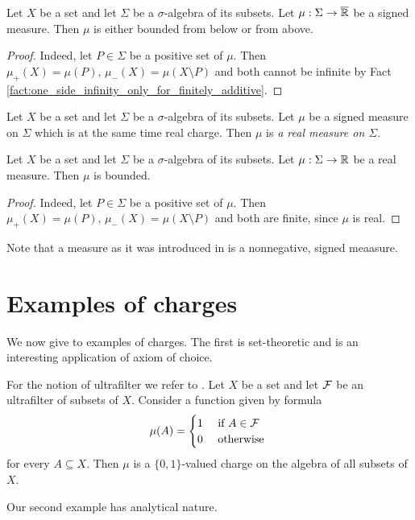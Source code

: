 \begin{corollary}\label{corollary:signed_measures_are_one_sided_bounded}
    Let $X$ be a set and let $\Sigma$ be a $\sigma$-algebra of its subsets. Let $\mu:\Sigma \rightarrow \overline{{\mathbb R}}$ be a signed measure. Then $\mu$ is either bounded from below or from above.
\end{corollary}
\begin{proof}
    Indeed, let $P \in \Sigma$ be a positive set of $\mu$. Then $\mu_+(X) = \mu(P),\,\mu_-(X) = \mu(X\setminus P)$ and both cannot be infinite by Fact \ref{fact:one_side_infinity_only_for_finitely_additive}.
\end{proof}

\begin{definition}
    Let $X$ be a set and let $\Sigma$ be a $\sigma$-algebra of its subsets. Let $\mu$ be a signed measure on $\Sigma$ which is at the same time real charge. Then $\mu$ is \textit{a real measure on $\Sigma$}.
\end{definition}

\begin{corollary}\label{corollary:real_measures_are_bounded}
    Let $X$ be a set and let $\Sigma$ be a $\sigma$-algebra of its subsets. Let $\mu:\Sigma \rightarrow {\mathbb R}$ be a real measure. Then $\mu$ is bounded.
\end{corollary}
\begin{proof}
    Indeed, let $P \in \Sigma$ be a positive set of $\mu$. Then $\mu_+(X) = \mu(P),\,\mu_-(X) = \mu(X\setminus P)$ and both are finite, since $\mu$ is real.
\end{proof}

\begin{remark}\label{remark:measure_is_nonnegative_signed_measure}
    Note that a measure as it was introduced in \cite{Integration} is a nonnegative, signed meaasure.
\end{remark}


\section{Examples of charges}
\noindent
We now give to examples of charges. The first is set-theoretic and is an interesting application of axiom of choice. 

\begin{example}\label{example:ultrafilter_charge}
    For the notion of ultrafilter we refer to \cite{Filters_in_topology}. Let $X$ be a set and let ${\mathcal F}$ be an ultrafilter of subsets of $X$. Consider a function given by formula
    $$\mu(A) = \begin{cases}
        1 & \mbox{ if }A \in {\mathcal F} \\
        0 & \mbox{ otherwise }   \\
    \end{cases}
    $$
    for every $A \subseteq X$. Then $\mu$ is a $\{0,1\}$-valued charge on the algebra of all subsets of $X$.
\end{example}
\noindent
Our second example has analytical nature.

